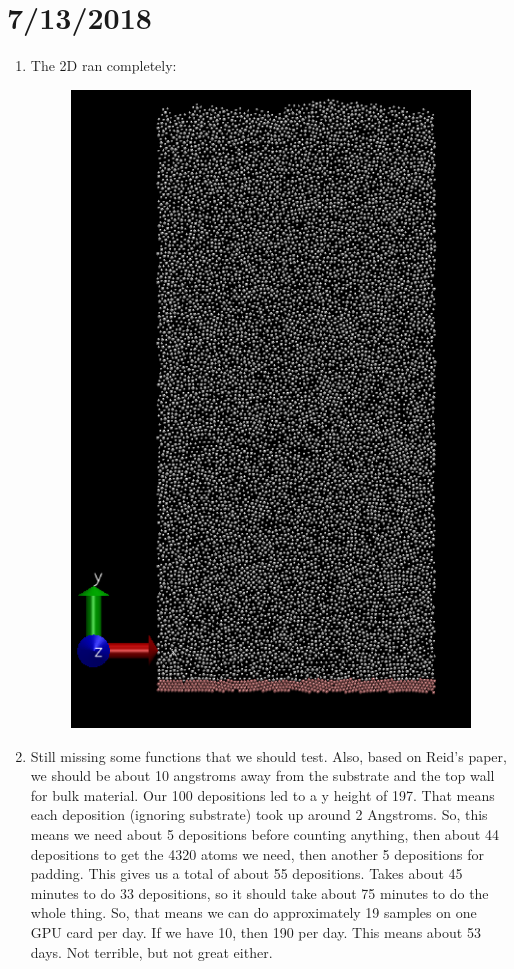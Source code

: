 \documentclass[12pt,reqno]{amsart}
\numberwithin{equation}{section}
\begin{document}
\section{7/13/2018}
\begin{enumerate}
\item The 2D ran completely:
\begin{figure}[H]
\centering
\includegraphics[scale=0.6]{pvd-full}
\end{figure}
\item Still missing some functions that we should test.  Also, based on Reid's paper, we should be about 10 angstroms away from the substrate and the top wall for bulk material.  Our 100 depositions led to a y height of 197.  That means each deposition (ignoring substrate) took up around 2 Angstroms.  So, this means we need about 5 depositions before counting anything, then about 44 depositions to get the 4320 atoms we need, then another 5 depositions for padding.  This gives us a total of about 55 depositions.  Takes about 45 minutes to do 33 depositions, so it should take about 75 minutes to do the whole thing.  So, that means we can do approximately 19 samples on one GPU card per day.  If we have 10, then 190 per day.  This means about 53 days.  Not terrible, but not great either.  

\end{enumerate}
\end{document}
